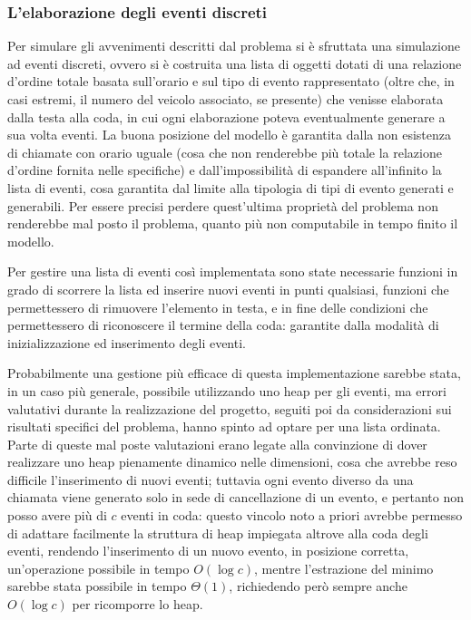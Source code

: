 \documentclass[a4paper,11pt]{Article}
\begin{document}
\subsubsection{L'elaborazione degli eventi discreti}
Per simulare gli avvenimenti descritti dal problema si è sfruttata una simulazione ad eventi discreti, ovvero si è costruita una lista di oggetti dotati di una relazione d'ordine totale basata sull'orario e sul tipo di evento rappresentato (oltre che, in casi estremi, il numero del veicolo associato, se presente) che venisse elaborata dalla testa alla coda, in cui ogni elaborazione poteva eventualmente generare a sua volta eventi.
La buona posizione del modello è garantita dalla non esistenza di chiamate con orario uguale (cosa che non renderebbe più totale la relazione d'ordine fornita nelle specifiche) e dall'impossibilità di espandere all'infinito la lista di eventi, cosa garantita dal limite alla tipologia di tipi di evento generati e generabili. Per essere precisi perdere quest'ultima proprietà del problema non renderebbe mal posto il problema, quanto più non computabile in tempo finito il modello.

Per gestire una lista di eventi così implementata sono state necessarie funzioni in grado di scorrere la lista ed inserire nuovi eventi in punti qualsiasi, funzioni che permettessero di rimuovere l'elemento in testa, e in fine delle condizioni che permettessero di riconoscere il termine della coda: garantite dalla modalità di inizializzazione ed inserimento degli eventi.

Probabilmente una gestione più efficace di questa implementazione sarebbe stata, in un caso più generale, possibile utilizzando uno heap per gli eventi, ma errori valutativi durante la realizzazione del progetto, seguiti poi da considerazioni sui risultati specifici del problema, hanno spinto ad optare per una lista ordinata. Parte di queste mal poste valutazioni erano legate alla convinzione di dover realizzare uno heap pienamente dinamico nelle dimensioni, cosa che avrebbe reso difficile l'inserimento di nuovi eventi; tuttavia ogni evento diverso da una chiamata viene generato solo in sede di cancellazione di un evento, e pertanto non posso avere più di $c$ eventi in coda: questo vincolo noto a priori avrebbe permesso di adattare facilmente la struttura di heap impiegata altrove alla coda degli eventi, rendendo l'inserimento di un nuovo evento, in posizione corretta, un'operazione possibile in tempo $O(\log{c})$, mentre l'estrazione del minimo sarebbe stata possibile in tempo $\Theta(1)$, richiedendo però sempre anche $O(\log{c})$ per ricomporre lo heap.
\end{document}
